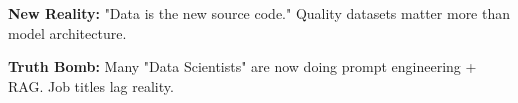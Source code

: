 \begin{frame}[fragile]
\vspace{0.3cm}
\textbf{New Reality:}
"Data is the new source code." Quality datasets matter more than model architecture.

\vspace{0.3cm}
\textbf{Truth Bomb:}
Many "Data Scientists" are now doing prompt engineering + RAG. Job titles lag reality.
 
\end{frame}


